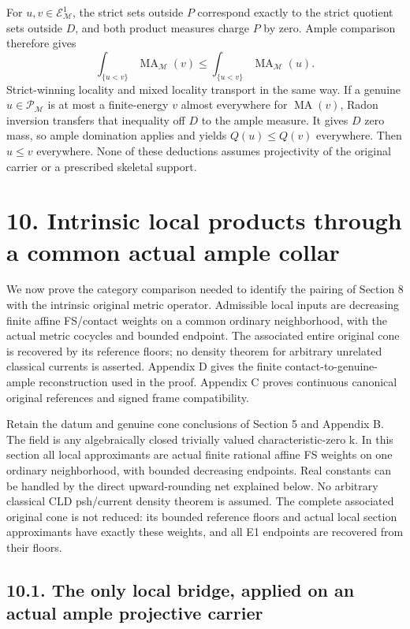 \documentclass[
  10pt,
]{article}
\begin{document}
For \(u,v\in\mathcal E^1_{\mathcal M}\), the strict sets outside \(P\)
correspond exactly to the strict quotient sets outside \(D\), and both
product measures charge \(P\) by zero. Ample comparison therefore gives
\[\int_{\{u<v\}}\operatorname{MA}_{\mathcal M}(v)
\leq\int_{\{u<v\}}\operatorname{MA}_{\mathcal M}(u).            \tag{9.7}\]
Strict-winning locality and mixed locality transport in the same way. If
a genuine \(u\in\mathcal P_{\mathcal M}\) is at most a finite-energy
\(v\) almost everywhere for \(\operatorname{MA}(v)\), Radon inversion
transfers that inequality off \(D\) to the ample measure. It gives \(D\)
zero mass, so ample domination applies and yields \(Q(u)\leq Q(v)\)
everywhere. Then \(u\leq v\) everywhere. None of these deductions
assumes projectivity of the original carrier or a prescribed skeletal
support.

\section{10. Intrinsic local products through a common actual ample
collar}\label{intrinsic-local-products-through-a-common-actual-ample-collar}

We now prove the category comparison needed to identify the pairing of
Section 8 with the intrinsic original metric operator. Admissible local
inputs are decreasing finite affine FS/contact weights on a common
ordinary neighborhood, with the actual metric cocycles and bounded
endpoint. The associated entire original cone is recovered by its
reference floors; no density theorem for arbitrary unrelated classical
currents is asserted. Appendix D gives the finite
contact-to-genuine-ample reconstruction used in the proof. Appendix C
proves continuous canonical original references and signed frame
compatibility.

Retain the datum and genuine cone conclusions of Section 5 and Appendix
B. The field is any algebraically closed trivially valued
characteristic-zero k. In this section all local approximants are actual
finite rational affine FS weights on one ordinary neighborhood, with
bounded decreasing endpoints. Real constants can be handled by the
direct upward-rounding net explained below. No arbitrary classical CLD
psh/current density theorem is assumed. The complete associated original
cone is not reduced: its bounded reference floors and actual local
section approximants have exactly these weights, and all E1 endpoints
are recovered from their floors.

\subsection{10.1. The only local bridge, applied on an actual ample
projective
carrier}\label{the-only-local-bridge-applied-on-an-actual-ample-projective-carrier}
\end{document}

